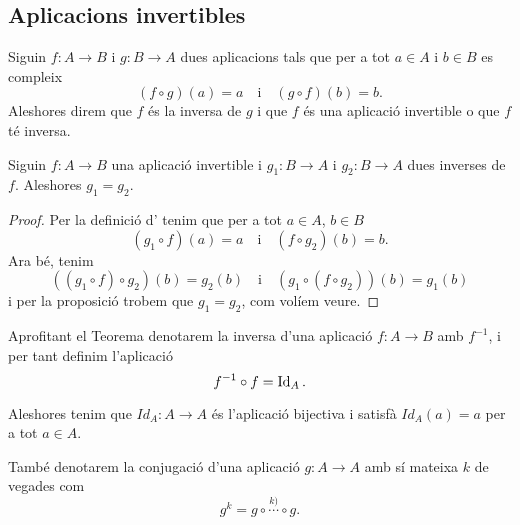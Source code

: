 \documentclass[../../Main.tex]{subfiles}
\begin{document}
	\subsection{Aplicacions invertibles}
	\begin{definition}
		\label{def:aplicació invertible}
		\label{def:inversa d'una aplicació}
		Siguin \(f\colon A\rightarrow B\) i \(g\colon B\rightarrow A\) dues aplicacions tals que per a tot \(a\in A\) i \(b\in B\) es compleix
		\[(f\circ g)(a)=a\quad\text{i}\quad(g\circ f)(b)=b.\]
		Aleshores direm que \(f\) és la inversa de \(g\) i que \(f\) és una aplicació invertible o que \(f\) té inversa.
	\end{definition}
	\begin{theorem}
		\label{thm:unicitat de les inverses de les aplicacions bijectives}
		Siguin \(f\colon A\rightarrow B\) una aplicació invertible i \(g_{1}\colon B\rightarrow A\) i \(g_{2}\colon B\rightarrow A\) dues inverses de \(f\). Aleshores \(g_{1}=g_{2}\).
		\begin{proof}
			Per la definició d' tenim que per a tot \(a\in A\), \(b\in B\)
			\[(g_{1}\circ f)(a)=a\quad\text{i}\quad(f\circ g_{2})(b)=b.\]
			Ara bé, tenim
			\[((g_{1}\circ f)\circ g_{2})(b)=g_{2}(b)\quad\text{i}\quad(g_{1}\circ(f\circ g_{2}))(b)=g_{1}(b)\]
			i per la proposició  trobem que \(g_{1}=g_{2}\), com volíem veure.
		\end{proof}
	\end{theorem}
	\begin{notation}
		\label{notation:aplicació identitat}
		Aprofitant el Teorema  denotarem la inversa d'una aplicació \(f:A\rightarrow B\) amb \(f^{-1}\), i per tant definim l'aplicació
		\[f^{-1}\circ f=\operatorname{Id}_{A}.\]
		
		Aleshores tenim que \(Id_{A}\colon A\rightarrow A\) és l'aplicació bijectiva i satisfà \(Id_{A}(a)=a\) per a tot \(a\in A\).
		
		També denotarem la conjugació d'una aplicació \(g\colon A\rightarrow A\) amb sí mateixa \(k\) de vegades com \[g^{k}=g\circ\overset{k)}{\cdots}\circ g.\]
	\end{notation}
\end{document}
